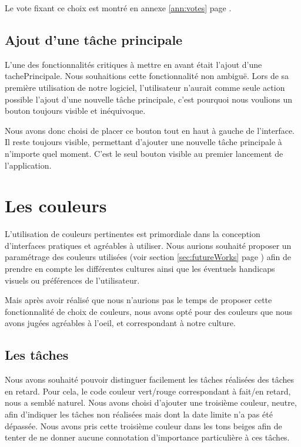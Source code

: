 \documentclass[11pt]{article}
\begin{document}
Le vote fixant ce choix est montré en annexe \ref{ann:votes} page
\pageref{fig:croixgroupevote}.



\subsection{Ajout d'une tâche principale}

L'une des fonctionnalités critiques à mettre en avant était l'ajout
d'une \gls{tachePrincipale}. Nous souhaitions cette fonctionnalité non
ambiguë. Lors de sa première utilisation de notre logiciel,
l'utilisateur n'aurait comme seule action possible l'ajout d'une
nouvelle tâche principale, c'est pourquoi nous voulions un bouton
toujours visible et inéquivoque.

Nous avons donc choisi de placer ce bouton tout en haut à gauche de
l'interface. Il reste toujours visible, permettant d'ajouter une
nouvelle tâche principale à n'importe quel moment. C'est le seul
bouton visible au premier lancement de l'application.


\section{Les couleurs}

L'utilisation de couleurs pertinentes est primordiale dans la
conception d'interfaces pratiques et agréables à utiliser. Nous
aurions souhaité proposer un paramétrage des couleurs utilisées (voir
section \ref{sec:futureWorks} page \pageref{sec:futureWorks}) afin de
prendre en compte les différentes cultures ainsi que les éventuels
handicaps visuels ou préférences de l'utilisateur.

Mais après avoir réalisé que nous n'aurions pas le temps de proposer
cette fonctionnalité de choix de couleurs, nous avons opté pour des
couleurs que nous avons jugées agréables à l'oeil, et correspondant à
notre culture.


\subsection{Les tâches}

Nous avons souhaité pouvoir distinguer facilement les tâches réalisées
des tâches en retard. Pour cela, le code couleur vert/rouge
correspondant à fait/en retard, nous a semblé naturel. Nous avons
choisi d'ajouter une troisième couleur, neutre, afin d'indiquer les
tâches non réalisées mais dont la date limite n'a pas été dépassée.
Nous avons pris cette troisième couleur dans les tons beiges afin de
tenter de ne donner aucune connotation d'importance particulière à ces
tâches.
\end{document}
